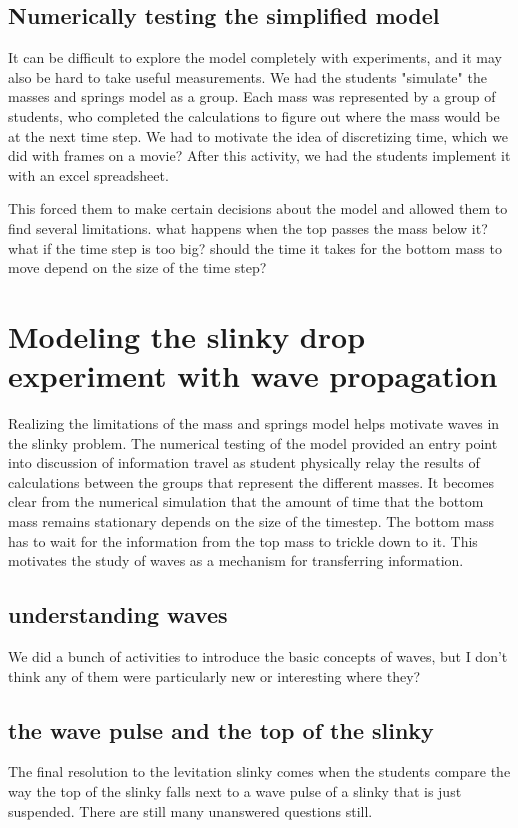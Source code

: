 \documentclass[aps,pre,10pt,superscriptaddress,showpacs,amsmath,amssymb,nofootinbib]{revtex4-1}
\begin{document}
\subsection{Numerically testing the simplified model}
It can be difficult to explore the model completely with experiments,  and it may also be hard to take useful measurements.  We had the students "simulate" the masses and springs model as a group. Each mass was represented by a group of students, who completed the calculations to figure out where the mass would be at the next time step.  We had to motivate the idea of discretizing time, which we did with frames on a movie?  After this activity, we had the students implement it with an excel spreadsheet.  

This forced them to make certain decisions about the model and allowed them to find several limitations.  what happens when the top passes the mass below it?  what if the time step is too big?  should the time it takes for the bottom mass to move depend on the size of the time step?


\section{Modeling the slinky drop experiment with wave propagation}

Realizing the limitations of the  mass and springs model helps motivate waves in the slinky problem.  The numerical testing of the model provided an entry point into discussion of information travel as student  physically relay the results of calculations between the groups that represent the different masses.  It becomes clear from the numerical simulation that the amount of time that the bottom mass remains stationary depends on the size of the timestep.  The bottom mass has to wait for the information from the top mass to trickle down to it.  This motivates the study of waves as a mechanism for transferring information.

\subsection{understanding waves}
 We did a bunch of activities to introduce the basic concepts of waves, but I don't think any of them were particularly new or interesting where they?

\subsection{the wave pulse and the top of the slinky }
The final resolution to the levitation slinky comes when the students compare the way the top of the slinky falls next to a wave pulse of a slinky that is just suspended.  There are still many unanswered questions still.
\end{document}
